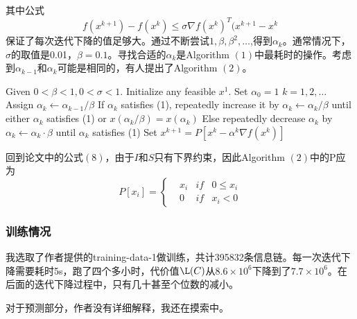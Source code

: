 \documentclass[UTF8]{ctexart}
\begin{document}
\par 其中公式
\begin{equation}
f(x^{k+1})-f(x^{k}) \leq \sigma \nabla f(x^{k})^{T}(x^{k+1}-x^{k}
\end{equation}
保证了每次迭代下降的值足够大。通过不断尝试$1,\beta,\beta^{2},\dots$,得到$\alpha_{k}$。通常情况下，$\sigma$的取值是0.01，$\beta = 0.1$。寻找合适的$\alpha_{k}$是Algorithm $(1)$中最耗时的操作。考虑到$\alpha_{k-1}$和$\alpha_{k}$可能是相同的，有人提出了Algorithm $(2)$。
\begin{codebox}[\indent ]
\zi  Given $0<\beta <1,0<\sigma<1$. Initialize any feasible $x^{1}$. Set $\alpha_{0}=1$
\zi \Indentmore {} $k=1,2,\dots$
\zi Assign $\alpha_{k} \leftarrow \alpha_{k-1}/ \beta$
\zi \Indentmore \Indentmore If $\alpha_{k}$ satisfies (1), repeatedly increase it by
\zi $\alpha_{k} \leftarrow \alpha_{k}/ \beta$
\End 
\zi until either $\alpha_{k}$ satisfies (1) or $x(\alpha_{k}/\beta)=x(\alpha_{k})$
\End
\zi \Indentmore \Indentmore Else repeatedly decrease $\alpha_{k}$ by
\zi $\alpha_{k} \leftarrow \alpha_{k} \cdot \beta$ \End
\zi until $\alpha_{k}$ satisfies (1) \End
\zi \Indentmore  Set
\zi $x^{k+1}=P\left [ x^{k}-\alpha^{k} \nabla f(x^{k}) \right ]$
\end{codebox}
\par 回到论文中的公式$(8)$，由于$I$和$S$只有下界约束，因此Algorithm $(2)$中的P应为
\begin{equation*}
P\left [ x_{i} \right ]=\left\{\begin{matrix}
 & x_{i} & if & 0\leq x_{i} \\
 & 0 & if & x_{i} < 0 
\end{matrix}\right.
\end{equation*}
\subsubsection*{训练情况}
\par 我选取了作者提供的training-data-1做训练，共计395832条信息链。每一次迭代下降需要耗时5s，跑了四个多小时，代价值$\L (C) $从$8.6\times 10^{6}$下降到了$7.7\times 10^{6}$。在后面的迭代下降过程中，只有几十甚至个位数的减小。
\par 对于预测部分，作者没有详细解释，我还在摸索中。
\newline
\par {}
\end{document}
